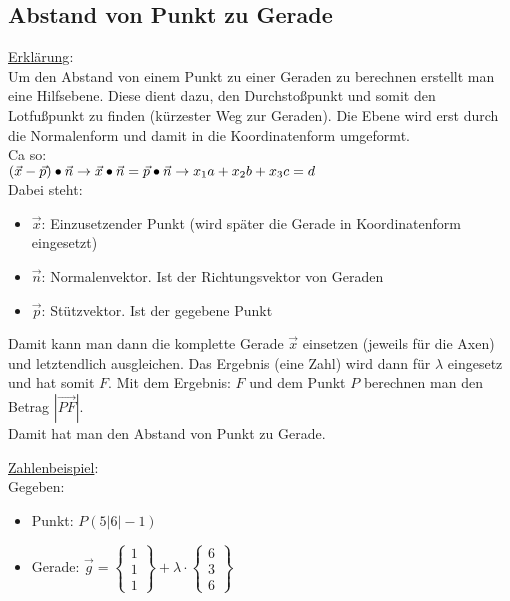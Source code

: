 \subsection{Abstand von Punkt zu Gerade}
\underline{Erklärung}: \\
Um den Abstand von einem Punkt zu einer Geraden zu berechnen erstellt man eine Hilfsebene.
Diese dient dazu, den Durchstoßpunkt und somit den Lotfußpunkt zu finden (kürzester Weg zur Geraden). 
Die Ebene wird erst durch die Normalenform und damit in die Koordinatenform umgeformt. \\
Ca so: \\
$
(\vec{x} - \vec{p}) \bullet \vec{n} \\
\rightarrow \vec{x} \bullet \vec{n} = \vec{p} \bullet \vec{n} \\
\rightarrow x_1a + x_2b + x_3c = d
$
\\
Dabei steht: 
\begin{itemize}
    \item $\vec{x}$: Einzusetzender Punkt (wird später die Gerade in Koordinatenform eingesetzt)
    \item $\vec{n}$: Normalenvektor. Ist der Richtungsvektor von Geraden 
    \item $\vec{p}$: Stützvektor. Ist der gegebene Punkt
\end{itemize}
Damit kann man dann die komplette Gerade $\vec{x}$ einsetzen 
(jeweils für die Axen) und letztendlich ausgleichen. 
Das Ergebnis (eine Zahl) wird dann für $\lambda$ eingesetz und hat somit $F$.
Mit dem Ergebnis: $F$ und dem Punkt $P$ berechnen man den Betrag $|\overrightarrow{PF}|$. \\
Damit hat man den Abstand von Punkt zu Gerade.
\par
\underline{Zahlenbeispiel}: \\
Gegeben: 
\begin{itemize}
    \item Punkt: $P(5|6|-1)$
    \item Gerade: $
        \vec{g} = 
        \begin{Bmatrix}
            1 \\ 1 \\ 1
        \end{Bmatrix}
        + \lambda \cdot
        \begin{Bmatrix}
            6 \\ 3 \\ 6
        \end{Bmatrix}
        $
\end{itemize}

